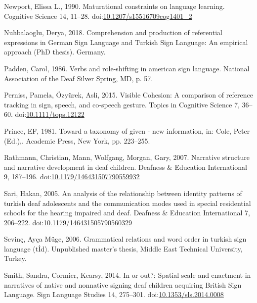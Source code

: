 \documentclass[]{elsarticle} %
\newlength{\cslhangindent}
\newenvironment{CSLReferences}[2] %
 {%
  \setlength{\parindent}{0pt}
  \ifodd #1 \everypar{\setlength{\hangindent}{\cslhangindent}}\ignorespaces\fi
  \ifnum #2 > 0
  \setlength{\parskip}{#2\baselineskip}
  \fi
 }%
 {}
\begin{document}
\begin{CSLReferences}{1}{0}
\leavevmode{}%
Newport, Elissa L., 1990. Maturational constraints on language learning.
Cognitive Science 14, 11--28.
doi:\href{https://doi.org/10.1207/s15516709cog1401_2}{10.1207/s15516709cog1401\_2}

\leavevmode{}%
Nuhbalaoglu, Derya, 2018. Comprehension and production of referential
expressions in German Sign Language and Turkish Sign Language: An
empirical approach (PhD thesis). Germany.

\leavevmode{}%
Padden, Carol, 1986. Verbs and role-shifting in american sign language.
National Association of the Deaf Silver Spring, MD, p. 57.

\leavevmode{}%
Perniss, Pamela, Özyürek, Asli, 2015. Visible Cohesion: A comparison of
reference tracking in sign, speech, and co-speech gesture. Topics in
Cognitive Science 7, 36--60.
doi:\href{https://doi.org/10.1111/tops.12122}{10.1111/tops.12122}

\leavevmode{}%
Prince, EF, 1981. Toward a taxonomy of given - new information, in:
Cole, Peter (Ed.),. Academic Press, New York, pp. 223--255.

\leavevmode{}%
Rathmann, Christian, Mann, Wolfgang, Morgan, Gary, 2007. Narrative
structure and narrative development in deaf children. Deafness \&
Education International 9, 187--196.
doi:\href{https://doi.org/10.1179/146431507790559932}{10.1179/146431507790559932}

\leavevmode{}%
Sari, Hakan, 2005. An analysis of the relationship between identity
patterns of turkish deaf adolescents and the communication modes used in
special residential schools for the hearing impaired and deaf. Deafness
\& Education International 7, 206--222.
doi:\href{https://doi.org/10.1179/146431505790560329}{10.1179/146431505790560329}

\leavevmode{}%
Sevinç, Ayça Müge, 2006. Grammatical relations and word order in turkish
sign language (t{İ}d). Unpublished master's thesis, Middle East
Technical University, Turkey.

\leavevmode{}%
Smith, Sandra, Cormier, Kearsy, 2014. In or out?: Spatial scale and
enactment in narratives of native and nonnative signing deaf children
acquiring British Sign Language. Sign Language Studies 14, 275--301.
doi:\href{https://doi.org/10.1353/sls.2014.0008}{10.1353/sls.2014.0008}


\end{CSLReferences}
\end{document}

